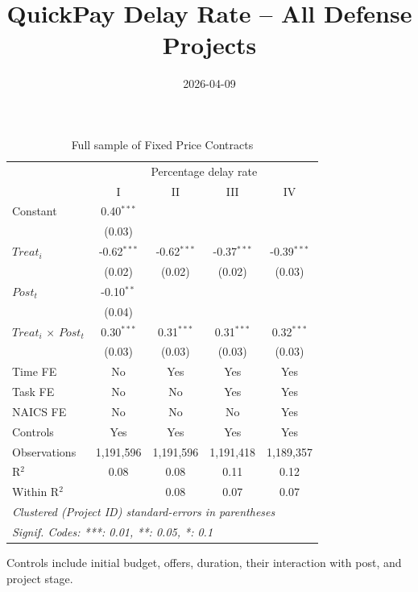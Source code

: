 \documentclass[
]{article}
\title{QuickPay Delay Rate -- All Defense Projects}
\author{}
\date{\vspace{-2.5em}2026-04-09}
\begin{document}
\maketitle

\begin{table}[htbp]
   \caption{Full sample of Fixed Price Contracts}
   \centering
   \footnotesize
   \begin{tabular}{lcccc}
      \toprule
       & \multicolumn{4}{c}{Percentage delay rate}\\
                                   & I             & II            & III           & IV\\  
      \midrule 
      Constant                     & 0.40$^{***}$  &               &               &   \\   
                                   & (0.03)        &               &               &   \\   
      $Treat_i$                    & -0.62$^{***}$ & -0.62$^{***}$ & -0.37$^{***}$ & -0.39$^{***}$\\   
                                   & (0.02)        & (0.02)        & (0.02)        & (0.03)\\   
      $Post_t$                     & -0.10$^{**}$  &               &               &   \\   
                                   & (0.04)        &               &               &   \\   
      $Treat_i$ $\times$ $Post_t$  & 0.30$^{***}$  & 0.31$^{***}$  & 0.31$^{***}$  & 0.32$^{***}$\\   
                                   & (0.03)        & (0.03)        & (0.03)        & (0.03)\\   
      \midrule 
      Time FE                      & No            & Yes           & Yes           & Yes\\  
      Task FE                      & No            & No            & Yes           & Yes\\  
      NAICS FE                     & No            & No            & No            & Yes\\  
      Controls                     & Yes           & Yes           & Yes           & Yes\\  
      Observations                 & 1,191,596     & 1,191,596     & 1,191,418     & 1,189,357\\  
      R$^2$                        & 0.08          & 0.08          & 0.11          & 0.12\\  
      Within R$^2$                 &               & 0.08          & 0.07          & 0.07\\  
      \midrule
      \multicolumn{5}{l}{\emph{Clustered (Project ID) standard-errors in parentheses}}\\
      \multicolumn{5}{l}{\emph{Signif. Codes: ***: 0.01, **: 0.05, *: 0.1}}\\
   \end{tabular}
   
   \par \raggedright 
   Controls include initial budget, offers, duration, their interaction with post, and project stage. 
\end{table}
\end{document}
